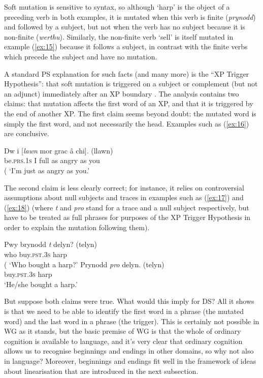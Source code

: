 \documentclass[output=paper
 	        ,biblatex
                ,babelshorthands
                ,newtxmath
                ,draftmode
                ,colorlinks, citecolor=brown
]{langscibook}
\begin{document}
\noindent
Soft mutation is sensitive to syntax, so although `harp' is the object of a preceding verb in both
examples, it is mutated when this verb is finite (\emph{prynodd}) and followed by a subject, but not
when the verb has no subject because it is non-finite (\emph{werthu}). Similarly, the non-finite
verb `sell' is itself mutated in example (\ref{ex:15}) because it follows a subject, in contrast
with the finite verbs which precede the subject and have no mutation.

A standard PS explanation for such facts (and many more) is the ``XP Trigger Hypothesis'': that soft
mutation is triggered on a subject or complement (but not an adjunct) immediately after an XP
boundary \citep[226]{BorsleyTallermanWillis2007}. The analysis contains two claims: that mutation
affects the first word of an XP, and that it is triggered by the end of another XP. The first claim
seems beyond doubt: the mutated word is simply the first word, and not necessarily the
head. Examples such as (\ref{ex:16}) are conclusive.

\ea
\label{ex:16}
\gll Dw                          i [\emph{lawn}   mor grac  â  chi]. (llawn)\\
     be.\textsc{prs}.1\textsc{s} I \spacebr{}full as  angry as you\\\hfill(
\glt `I'm just as angry as you.'
\z

\noindent
The second claim is less clearly correct; for instance, it relies on controversial assumptions about
null subjects and traces in examples such as (\ref{ex:17}) and (\ref{ex:18}) (where \emph{t} and
\emph{pro} stand for a trace and a null subject respectively, but have to be treated as full phrases
for purposes of the XP Trigger Hypothesis in order to explain the mutation following them).

\begin{exe}
\ex \label{ex:17}
\gll Pwy brynodd \emph{t} delyn? (telyn)\\
     who buy.\textsc{pst}.3\textsc{s} {} harp\\\hfill(
\glt `Who bought a harp?'
\ex \label{ex:18}
\gll Prynodd \emph{pro} delyn. (telyn)\\
     buy.\textsc{pst}.3\textsc{s} {} harp\\
\glt `He/she bought a harp.'
\end{exe}

\noindent
But suppose both claims were true. What would this imply for DS? All it shows is that we need to be
able to identify the first word in a phrase (the mutated word) and the last word in a phrase (the
trigger). This is certainly not possible in WG as it stands, but the basic premise of WG is that the
whole of ordinary cognition is available to language, and it's very clear that ordinary cognition
allows us to recognise beginnings and endings in other domains, so why not also in language?
Moreover, beginnings and endings fit well in the framework of ideas about linearisation that are
introduced in the next subsection.
\end{document}
